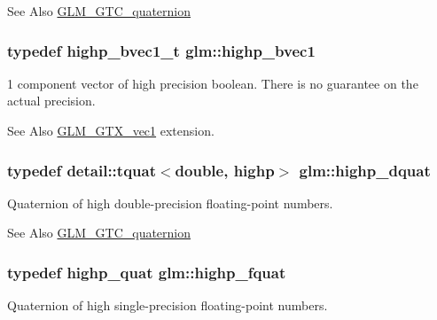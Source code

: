 \begin{DoxySeeAlso}{See Also}
\hyperlink{group__gtc__quaternion}{G\-L\-M\-\_\-\-G\-T\-C\-\_\-quaternion} 
\end{DoxySeeAlso}
\hypertarget{namespaceglm_ad24a2ac97dbfbece48f504224bb20b59}{
\subsubsection[{highp\-\_\-bvec1}]{\setlength{\rightskip}{0pt plus 5cm}typedef {\bf highp\-\_\-bvec1\-\_\-t} {\bf glm\-::highp\-\_\-bvec1}}}\label{namespaceglm_ad24a2ac97dbfbece48f504224bb20b59}
1 component vector of high precision boolean. There is no guarantee on the actual precision. \begin{DoxySeeAlso}{See Also}
\hyperlink{group__gtx__vec1}{G\-L\-M\-\_\-\-G\-T\-X\-\_\-vec1} extension. 
\end{DoxySeeAlso}
\hypertarget{namespaceglm_a6504747f6a2ec4a369a51244fcabc61e}{
\subsubsection[{highp\-\_\-dquat}]{\setlength{\rightskip}{0pt plus 5cm}typedef {\bf detail\-::tquat}$<$double, highp$>$ {\bf glm\-::highp\-\_\-dquat}}}\label{namespaceglm_a6504747f6a2ec4a369a51244fcabc61e}
Quaternion of high double-\/precision floating-\/point numbers.

\begin{DoxySeeAlso}{See Also}
\hyperlink{group__gtc__quaternion}{G\-L\-M\-\_\-\-G\-T\-C\-\_\-quaternion} 
\end{DoxySeeAlso}
\hypertarget{namespaceglm_ad1acf6af4ae4af94dfec8814b058d5eb}{
\subsubsection[{highp\-\_\-fquat}]{\setlength{\rightskip}{0pt plus 5cm}typedef {\bf highp\-\_\-quat} {\bf glm\-::highp\-\_\-fquat}}}\label{namespaceglm_ad1acf6af4ae4af94dfec8814b058d5eb}
Quaternion of high single-\/precision floating-\/point numbers.

